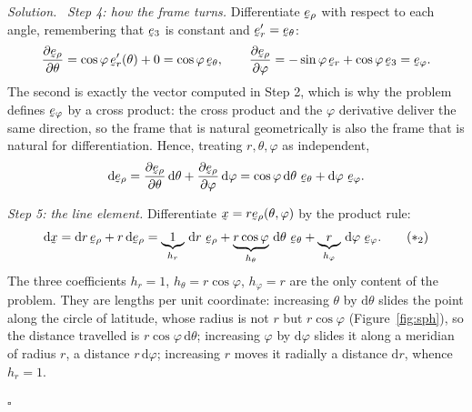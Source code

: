 \documentclass[17pt,a4paper]{extreport}
\DeclareRobustCommand{\vek}[1]{\underaccent{\tilde}{#1}}
\newcommand{\bx}{\vek{x}}
\newcommand{\be}{\vek{e}}
\newcommand{\ber}{\vek{e}_{r}}
\renewcommand{\beth}{\vek{e}_{\theta}}
\newcommand{\beph}{\vek{e}_{\varphi}}
\newcommand{\berho}{\vek{e}_{\rho}}
\newcommand{\dl}{\mathrm{d}}
\theoremstyle{scplain}
\theoremstyle{scdefn}
\theoremstyle{scplain}
\newenvironment{solution}
 {\par\smallskip\noindent\textit{Solution.}\ }
 {\hfill$\square$\par\medskip}
\begin{document}
\begin{solution}
\emph{Step 4: how the frame turns.}
Differentiate $\berho$ with respect to each angle, remembering that
$\be_{3}$ is constant and $\ber'=\beth$:
\[
   \frac{\partial\berho}{\partial\theta}
   =\cos\varphi\,\ber'(\theta)+0=\cos\varphi\,\beth,
   \qquad
   \frac{\partial\berho}{\partial\varphi}
   =-\sin\varphi\,\ber+\cos\varphi\,\be_{3}=\beph .
\]
The second is exactly the vector computed in Step 2, which is why the
problem defines $\beph$ by a cross product: the cross product and the
$\varphi$ derivative deliver the same direction, so the frame that is
natural geometrically is also the frame that is natural for differentiation.
Hence, treating $r,\theta,\varphi$ as independent,
\[
   \dl\berho=\frac{\partial\berho}{\partial\theta}\,\dl\theta
            +\frac{\partial\berho}{\partial\varphi}\,\dl\varphi
            =\cos\varphi\,\dl\theta\ \beth+\dl\varphi\ \beph .
\]

\emph{Step 5: the line element.}
Differentiate $\bx=r\berho(\theta,\varphi)$ by the product rule:
\begin{equation}
   \dl\bx=\dl r\,\berho+r\,\dl\berho
         =\underbrace{1}_{h_{r}}\,\dl r\ \berho
          +\underbrace{r\cos\varphi}_{h_{\theta}}\,\dl\theta\ \beth
          +\underbrace{r}_{h_{\varphi}}\,\dl\varphi\ \beph .
   \tag{$\ast_2$}
\end{equation}
The three coefficients $h_{r}=1$, $h_{\theta}=r\cos\varphi$, $h_{\varphi}=r$
are the only content of the problem. They are lengths per unit coordinate:
increasing $\theta$ by $\dl\theta$ slides the point along the circle of
latitude, whose radius is not $r$ but $r\cos\varphi$ (Figure~\ref{fig:sph}),
so the distance travelled is $r\cos\varphi\,\dl\theta$; increasing $\varphi$
by $\dl\varphi$ slides it along a meridian of radius $r$, a distance
$r\,\dl\varphi$; increasing $r$ moves it radially a distance $\dl r$,
whence $h_{r}=1$.


\end{solution}
\end{document}

